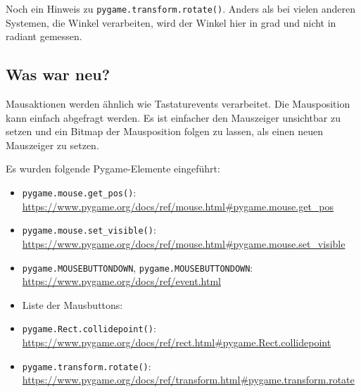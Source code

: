
Noch ein Hinweis zu \texttt{pygame.transform.rotate()}. Anders als bei vielen anderen Systemen, die Winkel verarbeiten, wird der Winkel hier in \gls{grad} und nicht in \gls{radiant} gemessen.


\subsection*{Was war neu?}

Mausaktionen werden ähnlich wie Tastaturevents verarbeitet. Die Mausposition kann einfach abgefragt werden. Es ist einfacher den Mauszeiger unsichtbar zu setzen und ein Bitmap der Mausposition folgen zu lassen, als einen neuen Mauszeiger zu setzen.

Es wurden folgende Pygame-Elemente eingeführt:
\begin{itemize}
	\item \texttt{pygame.mouse.get\_pos()}:
    \\ \url{https://www.pygame.org/docs/ref/mouse.html#pygame.mouse.get_pos}

	\item \texttt{pygame.mouse.set\_visible()}:
    \\ \url{https://www.pygame.org/docs/ref/mouse.html#pygame.mouse.set_visible}

	\item \texttt{pygame.MOUSEBUTTONDOWN}, \texttt{pygame.MOUSEBUTTONDOWN}:
    \\ \url{https://www.pygame.org/docs/ref/event.html}

	\item Liste der Mausbuttons: 

	\item \texttt{pygame.Rect.collidepoint()}:
    \\ \url{https://www.pygame.org/docs/ref/rect.html#pygame.Rect.collidepoint}

	\item \texttt{pygame.transform.rotate()}:
    \\ \url{https://www.pygame.org/docs/ref/transform.html#pygame.transform.rotate}

\end{itemize}


